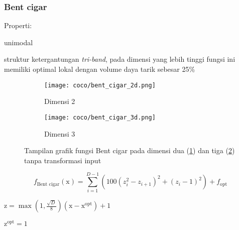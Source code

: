 \subsubsection{Bent cigar}
\noindent Properti:
\begin{packed_item}
  \item unimodal
  \item struktur ketergantungan \textit{tri-band}, pada dimensi yang lebih tinggi fungsi ini memiliki optimal lokal dengan volume daya tarik sebesar 25\%
\end{packed_item}
\begin{figure}[H]
	\centering
	\begin{subfigure}[b]{0.4\textwidth}
		\centering
		\texttt{[image: coco/bent\_cigar\_2d.png]}
		\caption{Dimensi 2}
		\label{fig:bent-cigar-coco-2d}
	\end{subfigure}
	\hfill
	\begin{subfigure}[b]{0.4\textwidth}
		\centering
		\texttt{[image: coco/bent\_cigar\_3d.png]}
		\caption{Dimensi 3}
		\label{fig:bent-cigar-coco-3d}
	\end{subfigure}
	\caption{Tampilan grafik fungsi Bent cigar pada dimensi dua (\cref{fig:bent-cigar-coco-2d}) dan tiga (\cref{fig:bent-cigar-coco-3d}) tanpa transformasi input}
	\label{fig:bent_cigar_coco}
\end{figure}
\begin{equation}
  f_{\text{Bent cigar}}(\mathrm{x})=\sum_{i=1}^{D-1}(100(z_i^2-z_{i+1})^2+(z_i-1)^2)+f_{\text{opt}}
\end{equation}
\begin{packed_item}
    \item $\mathrm{z}=\max(1,\frac{\sqrt{D}}{8})(\mathrm{x}-\mathrm{x}^{\text{opt}})+1$
    \item $\mathrm{z}^{\text{opt}}=1$
\end{packed_item}

